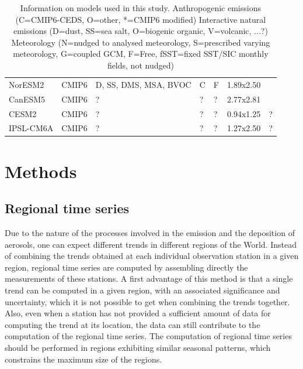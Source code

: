 \documentclass[journal abbreviation, manuscript]{copernicus}
\begin{document}
\begin{table}[]
\begin{tabularx}{\textwidth}{llllllX}
  NorESM2    & CMIP6     & D, SS, DMS, MSA, BVOC      & C                          & F           & 1.89x2.50                  & \cite{olivieprep, selandprep, kirkevag2018production}               \\
  CanESM5    & CMIP6     & ?                          &             ?               & ?           & 2.77x2.81                  & \cite{gmd-12-4823-2019}                                             \\
  CESM2      & CMIP6     & ?                          & ?                          & ?           & 0.94x1.25                  &             ?                                                        \\
  IPSL-CM6A  & CMIP6     & ?                          & ?                          & ?           & 1.27x2.50                  &              ?                                                       \\ \bottomrule
 \end{tabularx}
 \caption{Information on models used in this study.
  Anthropogenic emissions (C=CMIP6-CEDS, O=other, *=CMIP6 modified)
  Interactive natural emissions (D=dust, SS=sea salt, O=biogenic organic, V=volcanic, ...?)
  Meteorology (N=nudged to analysed meteorology, S=prescribed varying meteorology, G=coupled GCM, F=Free, fSST=fixed SST/SIC monthly fields, not nudged)
 }
 \label{table:models}
\end{table}

\section{Methods}

\subsection{Regional time series}
Due to the nature of the processes involved in the emission and the deposition of aerosols, one can expect different trends in different regions of the World. Instead of combining the trends obtained at each individual observation station in a given region, regional time series are computed by assembling directly the measurements of these stations. A first advantage of this method is that a single trend can be computed in a given region, with an associated significance and uncertainty, which it is not possible to get when combining the trends together. Also, even when a station has not provided a sufficient amount of data for computing the trend at its location, the data can still contribute to the computation of the regional time series. The computation of regional time series should be performed in regions exhibiting similar seasonal patterns, which constrains the maximum size of the regions.
\end{document}

